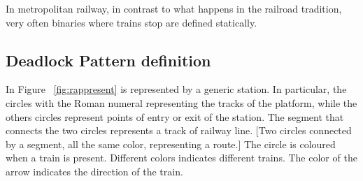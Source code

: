 \documentclass{ewic}
\begin{document}
			
			
			In metropolitan railway, in contrast to what happens in the railroad tradition, very often binaries where trains stop are defined statically.
			 
			
			
			
			 
			
			
			
			\subsection{Deadlock Pattern definition}\label{sec:deadlockpatterndefinition}
			
			In Figure ~\ref{fig:rappresent} is represented by a generic station.
			In particular, the circles with the Roman numeral representing the tracks of the platform, while the others circles represent points of entry or exit of the station.
			The segment that connects the two circles represents a track of railway line.
			  [Two circles connected by a segment, all the same color, representing a route.]
			The circle is coloured when a train is present. Different colors indicates different trains. The color of the arrow indicates the direction of the train.
			
\end{document}
